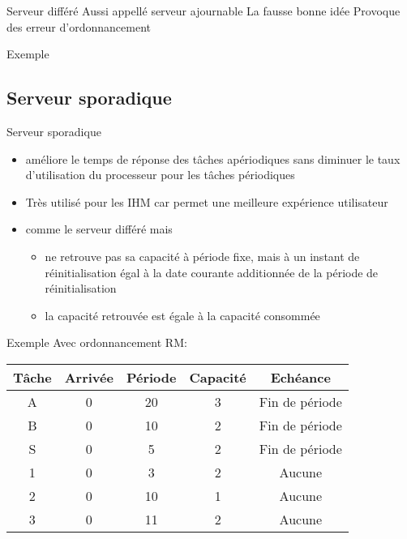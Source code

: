 \begin{frame}{Serveur différé}
  Aussi appellé serveur ajournable
  La fausse bonne idée
  Provoque des erreur d'ordonnancement
\end{frame}

\begin{frame}{Exemple}
\end{frame} 

\subsection{Serveur sporadique}

\begin{frame}{Serveur sporadique}
  \begin{itemize}
  \item  améliore le  temps de  réponse des  tâches  apériodiques sans
    diminuer  le  taux d'utilisation  du  processeur  pour les  tâches
    périodiques
  \item Très utilisé pour les  IHM car permet une meilleure expérience
    utilisateur
  \item comme le serveur différé mais 
    \begin{itemize}
    \item  ne retrouve  pas  sa capacité  à  période fixe,  mais à  un
      instant de réinitialisation égal  à la date courante additionnée
      de la période de réinitialisation
      \item la capacité retrouvée est égale à la capacité consommée 
      \end{itemize}
    \end{itemize}
\end{frame} 

\begin{frame}{Exemple}
  Avec ordonnancement RM:
  \begin{center}
    \begin{tabular}{ccccc}
      \hline
      Tâche & Arrivée & Période & Capacité & Echéance \\
      \hline
      A & 0 & 20 & 3 & Fin de période\\
      B & 0 & 10 & 2 & Fin de période\\
      S & 0 &  5 & 2 & Fin de période\\
      1 & 0 &  3 & 2 & Aucune\\
      2 & 0 & 10 & 1 & Aucune\\
      3 & 0 & 11 & 2 & Aucune\\
      \hline
    \end{tabular}
  \end{center}
\end{frame} 


